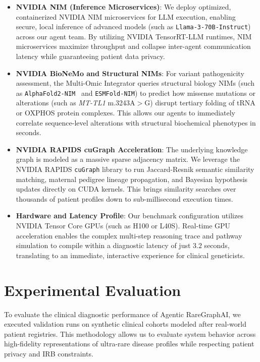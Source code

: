 \documentclass[conference]{IEEEtran}
\begin{document}
\begin{itemize}
    \item \textbf{NVIDIA NIM (Inference Microservices)}: We deploy optimized, containerized NVIDIA NIM microservices for LLM execution, enabling secure, local inference of advanced models (such as \texttt{Llama-3-70B-Instruct}) across our agent team. By utilizing NVIDIA TensorRT-LLM runtimes, NIM microservices maximize throughput and collapse inter-agent communication latency while guaranteeing patient data privacy.
    \item \textbf{NVIDIA BioNeMo and Structural NIMs}: For variant pathogenicity assessment, the Multi-Omic Integrator queries structural biology NIMs (such as \texttt{AlphaFold2-NIM}~\cite{ref9} and \texttt{ESMFold-NIM}) to predict how missense mutations or alterations (such as \textit{MT-TL1} m.3243A$>$G) disrupt tertiary folding of tRNA or OXPHOS protein complexes. This allows our agents to immediately correlate sequence-level alterations with structural biochemical phenotypes in seconds.
    \item \textbf{NVIDIA RAPIDS cuGraph Acceleration}: The underlying knowledge graph is modeled as a massive sparse adjacency matrix. We leverage the NVIDIA RAPIDS \texttt{cuGraph} library to run Jaccard-Resnik semantic similarity matching, maternal pedigree lineage propagation, and Bayesian hypothesis updates directly on CUDA kernels. This brings similarity searches over thousands of patient profiles down to sub-millisecond execution times.
    \item \textbf{Hardware and Latency Profile}: Our benchmark configuration utilizes NVIDIA Tensor Core GPUs (such as H100 or L40S). Real-time GPU acceleration enables the complex multi-step reasoning trace and pathway simulation to compile within a diagnostic latency of just $3.2$ seconds, translating to an immediate, interactive experience for clinical geneticists.
\end{itemize}

\section{Experimental Evaluation}
To evaluate the clinical diagnostic performance of Agentic RareGraphAI, we executed validation runs on synthetic clinical cohorts modeled after real-world patient registries. This methodology allows us to evaluate system behavior across high-fidelity representations of ultra-rare disease profiles while respecting patient privacy and IRB constraints.
\end{document}

